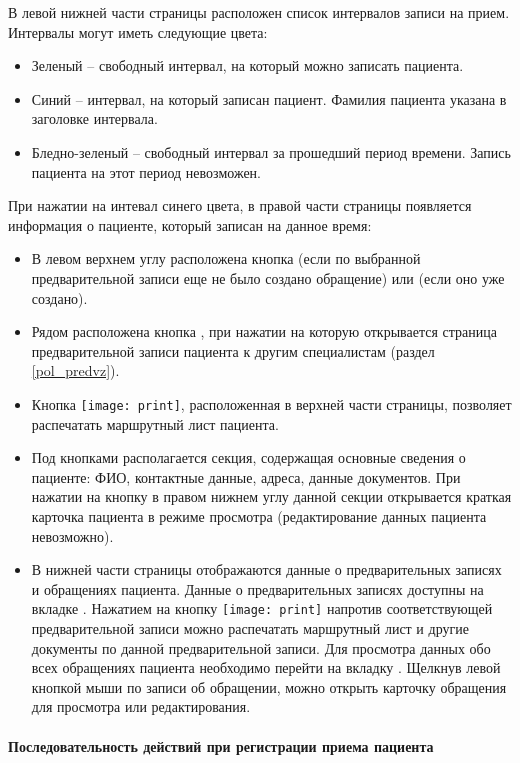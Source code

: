 В левой нижней части страницы расположен список интервалов записи на прием. Интервалы могут иметь следующие цвета:
\begin{itemize}
	\item Зеленый -- свободный интервал, на который можно записать пациента.
	\item Синий -- интервал, на который записан пациент. Фамилия пациента указана в заголовке интервала.
	\item Бледно-зеленый -- свободный интервал за прошедший период времени. Запись пациента на этот период невозможен. 
\end{itemize}

При нажатии на интевал синего цвета, в правой части страницы появляется информация о пациенте, который записан на данное время:
\begin{itemize}
	\item В левом верхнем углу расположена кнопка  (если по выбранной предварительной записи еще не было создано обращение) или  (если оно уже создано).
	\item Рядом расположена кнопка , при нажатии на которую открывается страница предварительной записи пациента к другим специалистам (раздел \ref{pol_predvz}).
	\item Кнопка \texttt{[image: print]}, расположенная в верхней части страницы, позволяет распечатать маршрутный лист пациента.
	\item Под кнопками располагается секция, содержащая основные сведения о пациенте: ФИО, контактные данные, адреса, данные документов. При нажатии на кнопку  в правом нижнем углу данной секции открывается краткая карточка пациента в режиме просмотра (редактирование данных пациента невозможно).
	\item В нижней части страницы отображаются данные о предварительных записях и обращениях пациента. Данные о предварительных записях доступны на вкладке  . Нажатием на кнопку \texttt{[image: print]} напротив соответствующей предварительной записи можно распечатать маршрутный лист и другие документы по данной предварительной записи. Для просмотра данных обо всех  обращениях пациента необходимо перейти на вкладку . Щелкнув левой кнопкой мыши по записи об обращении, можно открыть карточку обращения для просмотра или редактирования.
\end{itemize}  

\paragraph{Последовательность действий при регистрации приема пациента}

